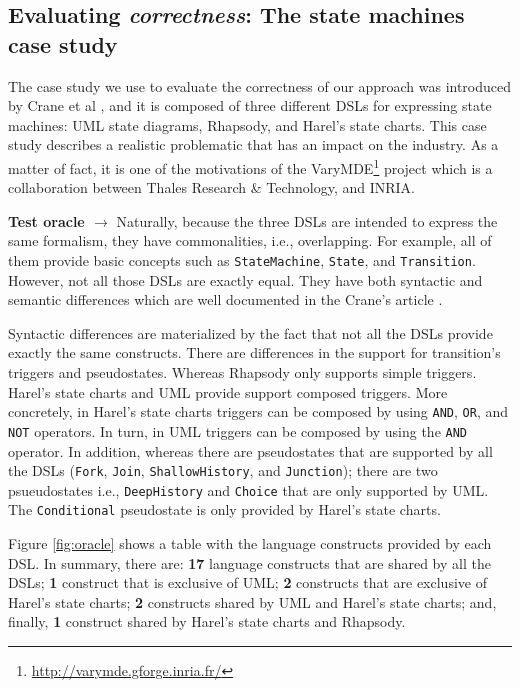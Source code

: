 \subsection{Evaluating \textit{correctness}: The state machines case study}

The case study we use to evaluate the correctness of our approach was introduced by Crane et al \cite{Crane:2007}, and it is composed of three different DSLs for expressing state machines: UML state diagrams, Rhapsody, and Harel's state charts. This case study describes a realistic problematic that has an impact on the industry. As a matter of fact, it is one of the motivations of the VaryMDE\footnote{\url{http://varymde.gforge.inria.fr/}} project which is a collaboration between Thales Research \& Technology, and INRIA.

\textbf{Test oracle $\rightarrow$} Naturally, because the three DSLs are intended to express the same formalism, they have commonalities, i.e., overlapping. For example, all of them provide basic concepts such as \texttt{StateMachine}, \texttt{State}, and \texttt{Transition}. However, not all those DSLs are exactly equal. They have both syntactic and semantic differences which are well documented in the Crane's article \cite{Crane:2007}.

Syntactic differences are materialized by the fact that not all the DSLs provide exactly the same constructs. There are differences in the support for transition's triggers and pseudostates. Whereas Rhapsody only supports simple triggers. Harel's state charts and UML provide support composed triggers. More concretely, in Harel's state charts triggers can be composed by using \texttt{AND}, \texttt{OR}, and \texttt{NOT} operators. In turn, in UML triggers can be composed by using  the \texttt{AND} operator. In addition, whereas there are pseudostates that are supported by all the DSLs (\texttt{Fork}, \texttt{Join}, \texttt{ShallowHistory}, and \texttt{Junction}); there are two psueudostates i.e., \texttt{DeepHistory} and \texttt{Choice} that are only supported by UML. The \texttt{Conditional} pseudostate is only provided by Harel's state charts.

Figure \ref{fig:oracle} shows a table with the language constructs provided by each DSL. In summary, there are: \textbf{17} language constructs that are shared by all the DSLs; \textbf{1} construct that is exclusive of UML; \textbf{2} constructs that are exclusive of Harel's state charts; \textbf{2} constructs shared by UML and Harel's state charts; and, finally, \textbf{1} construct shared by Harel's state charts and Rhapsody. 

